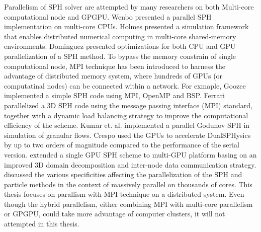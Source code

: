 Parallelism of SPH solver are attempted by many researchers on both Multi-core computational node and GPGPU. Wenbo \cite{wenbo2014performance} presented a parallel SPH implementation on multi-core CPUs. Holmes \cite{holmes2011framework} presented a simulation framework that enables distributed numerical computing in multi-core shared-memory environments. Dominguez \cite{dominguez2011optimization} presented optimizations for both CPU and GPU parallelization of a SPH method. To bypass the memory constrain of single computational node, MPI technique has been introduced to harness the advantage of distributed memory system, where hundreds of GPUs (or computatinal nodes) can be connected within a network. For exmaple, Goozee \cite{goozee2003distributed} implemented a simple SPH code using MPI, OpenMP and BSP. 
Ferrari \cite{ferrari2009new} parallelized a 3D SPH code using the message passing interface (MPI) standard, together with a dynamic load balancing strategy to improve the computational efficiency of the scheme. Kumar et. al. \cite{kumar2013parallel} implemented a parallel Godunov SPH in simulation of granular flows. Crespo \cite{crespo2015dualsphysics} used the GPUs to accelerate DualSPHysics by up to two orders of magnitude compared to the performance of the serial version. \citet{ji2016large} 
extended a single GPU SPH scheme to multi-GPU platform basing on an improved 3D domain decomposition and inter-node data communication strategy. \citet{oger2016distributed} discussed the various specificities affecting the parallelization of the SPH and particle methods in the context of massively parallel on thousands of cores.
This thesis focuses on parallism with MPI technique on a distributed system. Even though the hybrid parallelism, either combining MPI with multi-core parallelism or GPGPU, could take more advantage of computer clusters, it will not attempted in this thesis.

